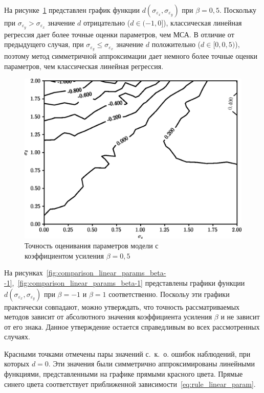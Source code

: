 На рисунке~\ref{fig:comparison_linear_params_beta-0,5}
представлен график функции \( d(\sigma_{\varepsilon_x}, \sigma_{\varepsilon_y}) \)
при \( \beta = 0{,}5 \).
Поскольку при \( \sigma_{\varepsilon_y} > \sigma_{\varepsilon_x} \)
значение \( d \) отрицательно (\( d \in ( -1, 0 ] \)),
классическая линейная регрессия дает более точные оценки параметров, чем МСА.
В отличие от предыдущего случая,
при \( \sigma_{\varepsilon_y} \le \sigma_{\varepsilon_x} \)
значение \( d \) положительно (\( d \in [0, 0{,}5 ) \)),
поэтому метод симметричной аппроксимации дает немного более точные оценки параметров,
чем классическая линейная регрессия.

\begin{figure}[t]
  \centering
  \includegraphics[width=135mm]{fig/linear/param/beta-0,5_param.png}
  \caption{Точность оценивания параметров модели с \\ коэффициентом усиления \( \beta = 0{,}5 \)}\label{fig:comparison_linear_params_beta-0,5}
\end{figure}

На рисунках~\ref{fig:comparison_linear_params_beta--1},~\ref{fig:comparison_linear_params_beta-1}
представлены графики функции \( d(\sigma_{\varepsilon_x}, \sigma_{\varepsilon_y}) \)
при \( \beta = -1 \) и \( \beta = 1 \) соответственно.
Поскольу эти графики практически совпадают, можно утверждать, что точность рассматриваемых
методов зависит от абсолютного значения коэффициента усиления \( \beta \) и не зависит от его знака.
Данное утверждение остается справедливым во всех рассмотренных случаях.

Красными точками отмечены пары значений с.~к.~о. ошибок наблюдений, при которых \( d = 0 \).
Эти значения были симметрично аппроксимированы линейными функциями,
представленными на графике прямыми красного цвета.
Прямые синего цвета соответствует приближенной зависимости~\eqref{eq:rule_linear_param}.

